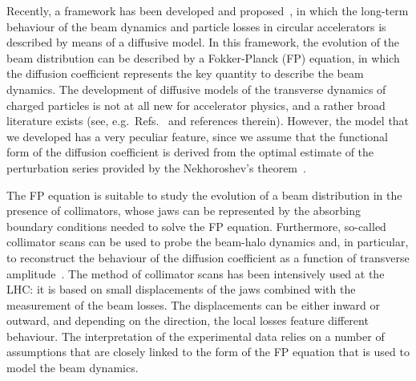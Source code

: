 Recently, a framework has been developed and proposed~\cite{Bazzani:2019lse,bazzani2020diffusion}, in which the long-term behaviour of the beam dynamics and particle losses in circular accelerators is described by means of a diffusive model. In this framework, the evolution of the beam distribution can be described by a Fokker-Planck (FP) equation, in which the diffusion coefficient represents the key quantity to describe the beam dynamics. The development of diffusive models of the transverse dynamics of charged particles is not at all new for accelerator physics, and a rather broad literature exists (see, e.g.\ Refs.~{\cite{Burnod:205343,Meddahi:223301,PhysRevLett.68.33,gerasimov1992applicability,MESS1994279,zimmermann1994transverse,PhysRevLett.77.1051,PhysRevSTAB.5.074001,flilleriii:pac03-rpag004,stancari2011diffusion,stancari:ipac11-tupz033,PhysRevSTAB.15.101001,Stancari:1637929}} and references therein). However, the model that we developed has a very peculiar feature, since we assume that the functional form of the diffusion coefficient is derived from the optimal estimate of the perturbation series provided by the Nekhoroshev's theorem~\cite{Nekhoroshev:1977aa,Bazzani:1990aa,Turchetti:1990aa}. 

The FP equation is suitable to study the evolution of a beam distribution in the presence of collimators, whose jaws can be represented by the absorbing boundary conditions needed to solve the FP equation. Furthermore, so-called collimator scans can be used to probe the beam-halo dynamics and, in particular, to reconstruct the behaviour of the diffusion coefficient as a function of transverse amplitude~\cite{MESS1994279,stancari2011diffusion,PhysRevSTAB.16.021003,PhysRevAccelBeams.23.044802}. The method of collimator scans has been intensively used at the LHC: it is based on small displacements of the jaws combined with the measurement of the beam losses. The displacements can be either inward or outward, and depending on the direction, the local losses feature different behaviour. The interpretation of the experimental data relies on a number of assumptions that are closely linked to the form of the FP equation that is used to model the beam dynamics. 


